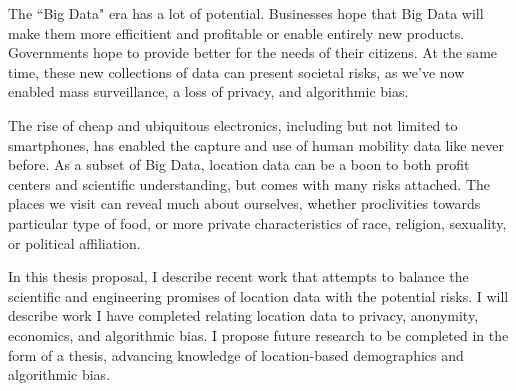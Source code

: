 The ``Big Data" era has a lot of potential.
Businesses hope that Big Data will make them more efficitient and profitable or enable entirely new products.
Governments hope to provide better for the needs of their citizens.
At the same time, these new collections of data can present societal risks, as we've now enabled mass surveillance, a loss of privacy, and algorithmic bias.

The rise of cheap and ubiquitous electronics, including but not limited to smartphones, has enabled the capture and use of human mobility data like never before.
As a subset of Big Data, location data can be a boon to both profit centers and scientific understanding, but comes with many risks attached.
The places we visit can reveal much about ourselves, whether proclivities towards particular type of food, or more private characteristics of race, religion, sexuality, or political affiliation.

In this thesis proposal, I describe recent work that attempts to balance the scientific and engineering promises of location data with the potential risks.
I will describe work I have completed relating location data to privacy, anonymity, economics, and algorithmic bias.
I propose future research to be completed in the form of a thesis, advancing knowledge of location-based demographics and algorithmic bias.
